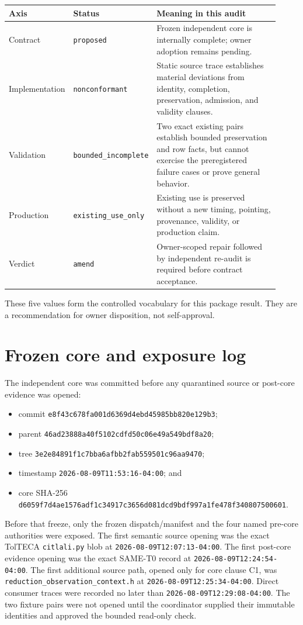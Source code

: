 \documentclass[11pt]{article}
\newcommand{\code}[1]{\texttt{#1}}
\begin{document}
\begin{longtable}{@{}L{0.23\linewidth}L{0.22\linewidth}L{0.47\linewidth}@{}}
\toprule
Axis & Status & Meaning in this audit \\
\midrule
\endhead
Contract & \code{proposed} & Frozen independent core is internally complete;
owner adoption remains pending. \\
Implementation & \code{nonconformant} & Static source trace establishes
material deviations from identity, completion, preservation, admission, and
validity clauses. \\
Validation & \code{bounded\_incomplete} & Two exact existing pairs establish
bounded preservation and row facts, but cannot exercise the preregistered
failure cases or prove general behavior. \\
Production & \code{existing\_use\_only} & Existing use is preserved without a
new timing, pointing, provenance, validity, or production claim. \\
Verdict & \code{amend} & Owner-scoped repair followed by independent re-audit
is required before contract acceptance. \\
\bottomrule
\end{longtable}

These five values form the controlled vocabulary for this package result.
They are a recommendation for owner disposition, not self-approval.

\section{Frozen core and exposure log}

The independent core was committed before any quarantined source or post-core
evidence was opened:

\begin{itemize}
\item commit \code{e8f43c678fa001d6369d4ebd45985bb820e129b3};
\item parent \code{46ad23888a40f5102cdfd50c06e49a549bdf8a20};
\item tree \code{3e2e84891f1c7bba6afbb2fab559501c96aa9470};
\item timestamp \code{2026-08-09T11:53:16-04:00}; and
\item core SHA-256
  \code{d6059f7d4ae1576adf1c34917c3656d081dcd9bdf997a1fe478f340807500601}.
\end{itemize}

Before that freeze, only the frozen dispatch/manifest and the four named
pre-core authorities were exposed.  The first semantic source opening was the
exact TolTECA \code{citlali.py} blob at
\code{2026-08-09T12:07:13-04:00}.  The first post-core evidence opening was
the exact SAME-T0 record at \code{2026-08-09T12:24:54-04:00}.  The first
additional source path, opened only for core clause C1, was
\code{reduction\_observation\_context.h} at
\code{2026-08-09T12:25:34-04:00}.  Direct consumer traces were recorded no
later than \code{2026-08-09T12:29:08-04:00}.  The two fixture pairs were not
opened until the coordinator supplied their immutable identities and approved
the bounded read-only check.
\end{document}
